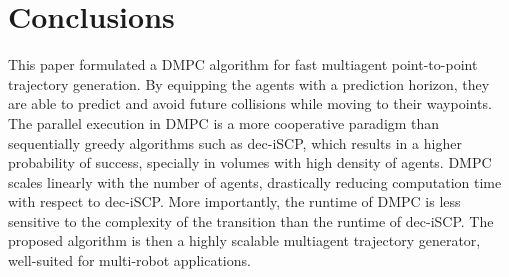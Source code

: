 \section{Conclusions}
\label{sec:conclusions}

This paper formulated a DMPC algorithm for fast multiagent point-to-point trajectory generation. By equipping the agents with a prediction horizon, they are able to predict and avoid future collisions while moving to their waypoints.  The parallel execution in DMPC is a more cooperative paradigm than sequentially greedy algorithms such as dec-iSCP, which results in a higher probability of success, specially in volumes with high density of agents. DMPC scales linearly with the number of agents, drastically reducing computation time with respect to dec-iSCP. More importantly, the runtime of DMPC is less sensitive to the complexity of the transition than the runtime of dec-iSCP. The proposed algorithm is then a highly scalable multiagent trajectory generator, well-suited for multi-robot applications.
